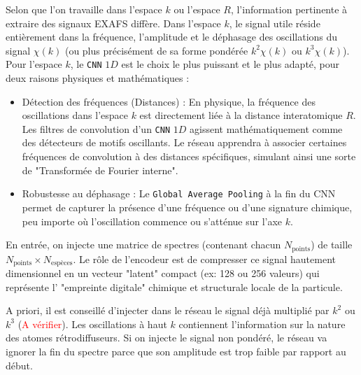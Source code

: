 \documentclass[12pt,a4paper,french]{book}
\begin{document}
 
 Selon que l'on travaille dans l'espace $k$ ou l'espace $R$, l'information pertinente à extraire des signaux EXAFS diffère.
 Dans l'espace $k$, le signal utile réside entièrement dans la fréquence, l'amplitude et le déphasage des oscillations du signal $\chi(k)$ (ou plus précisément de sa forme pondérée $k^2\chi(k)$ ou $k^3\chi(k)$).
 Pour l'espace $k$, le \verb+CNN+ $1D$ est le choix le plus puissant et le plus adapté, pour deux raisons physiques et mathématiques :
 \begin{itemize}
 	\item Détection des fréquences (Distances) : En physique, la fréquence des oscillations dans l'espace $k$ est directement liée à la distance interatomique $R$. Les filtres de convolution d'un \verb+CNN+ $1D$ agissent mathématiquement comme des détecteurs de motifs oscillants. Le réseau apprendra à associer certaines fréquences de convolution à des distances spécifiques, simulant ainsi une sorte de "Transformée de Fourier interne".
 	\item Robustesse au déphasage : Le \verb+Global Average Pooling+ à la fin du CNN permet de capturer la présence d'une fréquence ou d'une signature chimique, peu importe où l'oscillation commence ou s'atténue sur l'axe $k$.
 \end{itemize}
 
 

En entrée, on injecte une matrice de spectres (contenant chacun $N_\mathrm{points}$) de taille $N_\mathrm{points}\times N_\mathrm{espèces}$. Le rôle de l'encodeur est de compresser ce signal hautement dimensionnel en un vecteur "latent" compact (ex: 128 ou 256 valeurs) qui représente l' "empreinte digitale" chimique et structurale locale de la particule.

A priori, il est conseillé d'injecter dans le réseau le signal déjà multiplié par $k^2$ ou $k^3$ (\textcolor{red}{A vérifier}). Les oscillations à haut $k$ contiennent l'information sur la nature des atomes rétrodiffuseurs\cite{newville2004}. Si on injecte le signal non pondéré, le réseau va ignorer la fin du spectre parce que son amplitude est trop faible par rapport au début.
\end{document}
